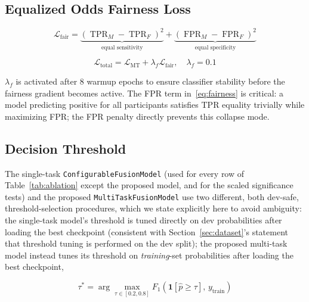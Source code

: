 \documentclass[5p,twocolumn]{elsarticle}
\begin{document}
\subsection{Equalized Odds Fairness Loss}

\begin{equation}
\mathcal{L}_\text{fair} =
  \underbrace{(\operatorname{TPR}_M - \operatorname{TPR}_F)^2}_{\text{equal sensitivity}}
  + \underbrace{(\operatorname{FPR}_M - \operatorname{FPR}_F)^2}_{\text{equal specificity}}
\label{eq:fairness}
\end{equation}

\begin{equation}
\mathcal{L}_\text{total} = \mathcal{L}_\text{MT} +
  \lambda_f \mathcal{L}_\text{fair}, \quad \lambda_f=0.1
\label{eq:total}
\end{equation}

$\lambda_f$ is activated after 8 warmup epochs to ensure classifier
stability before the fairness gradient becomes active. The FPR term
in~\eqref{eq:fairness} is critical: a model predicting positive for
all participants satisfies TPR equality trivially while maximizing FPR;
the FPR penalty directly prevents this collapse mode.

\subsection{Decision Threshold}
\label{subsec:threshold}

The single-task \texttt{ConfigurableFusionModel} (used for every row
of Table~\ref{tab:ablation} except the proposed model, and for the
scaled significance tests) and the proposed
\texttt{MultiTaskFusionModel} use two different, both dev-safe,
threshold-selection procedures, which we state explicitly here to
avoid ambiguity: the single-task model's threshold is tuned directly
on dev probabilities after loading the best checkpoint (consistent
with Section~\ref{sec:dataset}'s statement that threshold tuning is
performed on the dev split); the proposed multi-task model instead
tunes its threshold on \emph{training}-set probabilities after
loading the best checkpoint,

\begin{equation}
\tau^* = \arg\max_{\tau \in [0.2, 0.8]}
  F_1\!\left(\mathbf{1}[\hat{p} \geq \tau],\, y_{\text{train}}\right)
\label{eq:threshold}
\end{equation}
\end{document}
